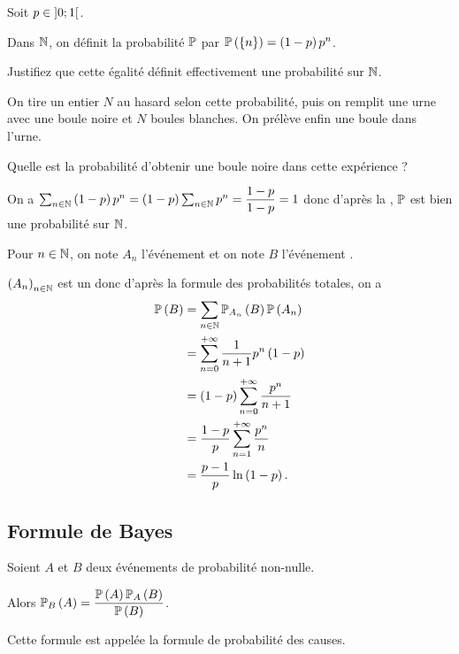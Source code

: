 \begin{exo}
Soit \(p\in\intervee{0}{1}\).

Dans \(\N\), on définit la probabilité \(\prem\) par \(\proba{\accol{n}}=\paren{1-p}p^n\).

Justifiez que cette égalité définit effectivement une probabilité sur \(\N\).

On tire un entier \(N\) au hasard selon cette probabilité, puis on remplit une urne avec une boule noire et \(N\) boules blanches. On prélève enfin une boule dans l'urne.

Quelle est la probabilité d'obtenir une boule noire dans cette expérience ?
\end{exo}

\begin{corr}
On a \(\sum_{n\in\N}\paren{1-p}p^n=\paren{1-p}\sum_{n\in\N}p^n=\dfrac{1-p}{1-p}=1\) donc d'après la , \(\prem\) est bien une probabilité sur \(\N\).

Pour \(n\in\N\), on note \(A_n\) l'événement  et on note \(B\) l'événement .

\(\paren{A_n}_{n\in\N}\) est un \sce donc d'après la formule des probabilités totales, on a \[\begin{aligned}
\proba{B}&=\sum_{n\in\N}\probacond{B}{A_n}\proba{A_n} \\
&=\sum_{n=0}^{\pinf}\dfrac{1}{n+1}p^n\paren{1-p} \\
&=\paren{1-p}\sum_{n=0}^{\pinf}\dfrac{p^n}{n+1} \\
&=\dfrac{1-p}{p}\sum_{n=1}^{\pinf}\dfrac{p^n}{n} \\
&=\dfrac{p-1}{p}\ln\paren{1-p}.
\end{aligned}\]
\end{corr}

\subsection{Formule de Bayes}

\begin{prop}
Soient \(A\) et \(B\) deux événements de probabilité non-nulle.

Alors \(\probacond{A}{B}=\dfrac{\proba{A}\probacond{B}{A}}{\proba{B}}\).
\end{prop}

Cette formule est appelée la formule de probabilité des causes.

